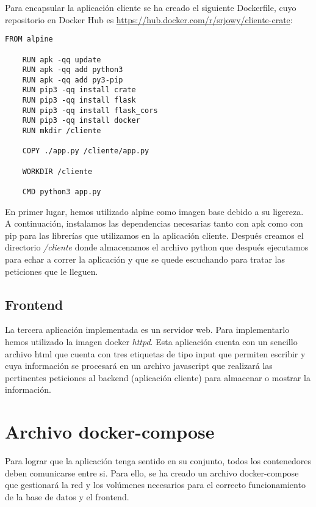 \documentclass[12pt]{article}
\begin{document}
Para encapsular la aplicación cliente se ha creado el siguiente Dockerfile, cuyo repositorio en
Docker Hub es \url{https://hub.docker.com/r/srjowy/cliente-crate}:

\begin{lstlisting}[caption={Archivo Dockerfile}, captionpos=b]
    FROM alpine

    RUN apk -qq update
    RUN apk -qq add python3
    RUN apk -qq add py3-pip
    RUN pip3 -qq install crate
    RUN pip3 -qq install flask
    RUN pip3 -qq install flask_cors
    RUN pip3 -qq install docker
    RUN mkdir /cliente
    
    COPY ./app.py /cliente/app.py
    
    WORKDIR /cliente
    
    CMD python3 app.py
\end{lstlisting}


En primer lugar, hemos utilizado alpine como imagen base debido a su ligereza. A continuación,
instalamos las dependencias necesarias tanto con apk como con pip para las librerías que utilizamos
en la aplicación cliente. Después creamos el directorio \emph{/cliente} donde almacenamos el archivo python
que después ejecutamos para echar a correr la aplicación y que se quede escuchando para tratar las peticiones
que le lleguen.

\subsection[3]{Frontend}

La tercera aplicación implementada es un servidor web. Para implementarlo hemos utilizado la imagen docker
\emph{httpd}. Esta aplicación cuenta con un sencillo archivo html que cuenta con tres etiquetas de tipo
input que permiten escribir y cuya información se procesará en un archivo javascript que realizará las
pertinentes peticiones al backend (aplicación cliente) para almacenar o mostrar la información.

\section{Archivo docker-compose}
Para lograr que la aplicación tenga sentido en su conjunto, todos los contenedores deben comunicarse entre
si. Para ello, se ha creado un archivo docker-compose que gestionará la red y los volúmenes necesarios para el
correcto funcionamiento de la base de datos y el frontend.
\end{document}
